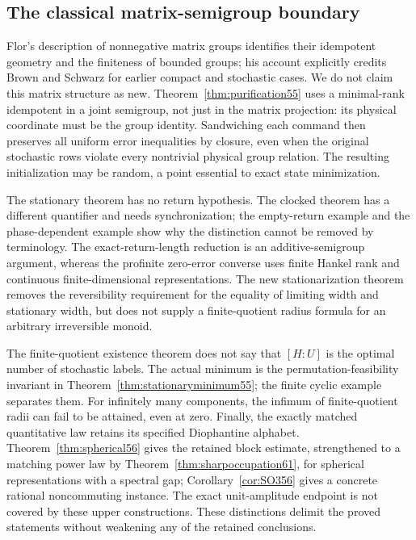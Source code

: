 \subsection{The classical matrix-semigroup boundary}
Flor's description of nonnegative matrix groups \cite[Theorems 2 and 3]{Flor} identifies their idempotent geometry and the finiteness of bounded groups; his account explicitly credits Brown and Schwarz for earlier compact and stochastic cases. We do not claim this matrix structure as new. Theorem~\ref{thm:purification55} uses a minimal-rank idempotent in a joint semigroup, not just in the matrix projection: its physical coordinate must be the group identity. Sandwiching each command then preserves all uniform error inequalities by closure, even when the original stochastic rows violate every nontrivial physical group relation. The resulting initialization may be random, a point essential to exact state minimization.

The stationary theorem has no return hypothesis. The clocked theorem has a different quantifier and needs synchronization; the empty-return example and the phase-dependent example show why the distinction cannot be removed by terminology. The exact-return-length reduction is an additive-semigroup argument, whereas the profinite zero-error converse uses finite Hankel rank and continuous finite-dimensional representations. The new stationarization theorem removes the reversibility requirement for the equality of limiting width and stationary width, but does not supply a finite-quotient radius formula for an arbitrary irreversible monoid.

The finite-quotient existence theorem does not say that $[H:U]$ is the optimal number of stochastic labels. The actual minimum is the permutation-feasibility invariant in Theorem~\ref{thm:stationaryminimum55}; the finite cyclic example separates them. For infinitely many components, the infimum of finite-quotient radii can fail to be attained, even at zero. Finally, the exactly matched quantitative law retains its specified Diophantine alphabet. Theorem~\ref{thm:spherical56} gives the retained block estimate, strengthened to a matching power law by Theorem~\ref{thm:sharpoccupation61}, for spherical representations with a spectral gap; Corollary~\ref{cor:SO356} gives a concrete rational noncommuting instance. The exact unit-amplitude endpoint is not covered by these upper constructions. These distinctions delimit the proved statements without weakening any of the retained conclusions.

